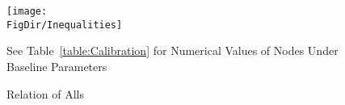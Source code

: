 \begin{figure}[ht]
  \centerline{
    \texttt{[image: \\FigDir/Inequalities]}
  }
  \caption{Relation of Alls} \label{fig:Inequalities}
\centerline{See Table~\ref{table:Calibration} for Numerical Values of Nodes Under Baseline Parameters}
\end{figure}
